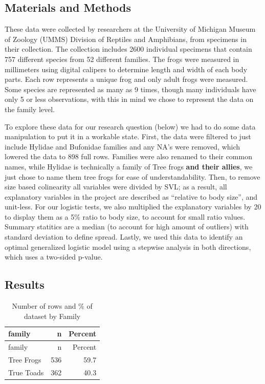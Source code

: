 \documentclass[
]{article}
\begin{document}
\subsection{Materials and Methods}\label{materials-and-methods}

These data were collected by researchers at the University of Michigan
Museum of Zoology (UMMS) Division of Reptiles and Amphibians, from
specimens in their collection. The collection includes 2600 individual
specimens that contain 757 different species from 52 different families.
The frogs were measured in millimeters using digital calipers to
determine length and width of each body parts. Each row represents a
unique frog and only adult frogs were measured. Some species are
represented as many as 9 times, though many individuals have only 5 or
less observations, with this in mind we chose to represent the data on
the family level.

To explore these data for our research question (below) we had to do
some data manipulation to put it in a workable state. First, the data
were filtered to just include Hylidae and Bufonidae families and any
NA's were removed, which lowered the data to 898 full rows. Families
were also renamed to their common names, while Hylidae is technically a
family of Tree frogs \textbf{and their allies}, we just chose to name
them tree frogs for ease of understandability. Then, to remove size
based colinearity all variables were divided by SVL; as a result, all
explanatory variables in the project are described as ``relative to body
size'', and unit-less. For our logistic tests, we also multiplied the
explanatory variables by 20 to display them as a 5\% ratio to body size,
to account for small ratio values. Summary statitics are a median (to
account for high amount of outliers) with standard deviation to define
spread. Lastly, we used this data to identify an optimal generalized
logistic model using a stepwise analysis in both directions, which uses
a two-sided p-value.

\subsection{Results}\label{results}

\begin{longtable}[]{@{}lrr@{}}
\caption{Number of rows and \% of dataset by Family}\tabularnewline
\toprule\noalign{}
family & n & Percent \\
\midrule\noalign{}
\endfirsthead
\toprule\noalign{}
family & n & Percent \\
\midrule\noalign{}
\endhead
\bottomrule\noalign{}
\endlastfoot
Tree Frogs & 536 & 59.7 \\
True Toads & 362 & 40.3 \\
\end{longtable}
\end{document}
